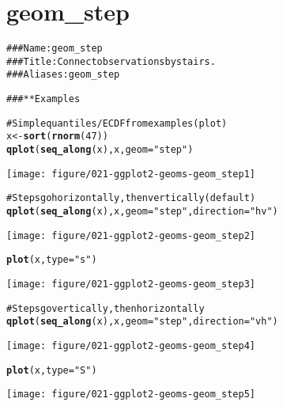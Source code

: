 \documentclass[a4paper,titlepage]{tufte-handout}\usepackage{graphicx, color}
\makeatletter
\def\maxwidth{ %
  \ifdim\Gin@nat@width>\linewidth
    \linewidth
  \else
    \Gin@nat@width
  \fi
}
\newcommand{\hlfunctioncall}[1]{\textcolor[rgb]{0.501960784313725,0,0.329411764705882}{\textbf{#1}}}%
\newcommand{\hlstring}[1]{\textcolor[rgb]{0.6,0.6,1}{#1}}%
\newcommand{\hlcomment}[1]{\textcolor[rgb]{0.180392156862745,0.6,0.341176470588235}{#1}}%
\newenvironment{kframe}{%
 \def\at@end@of@kframe{}%
 \ifinner\ifhmode%
  \def\at@end@of@kframe{\end{minipage}}%
  \begin{minipage}{\columnwidth}%
 \fi\fi%
 \def\FrameCommand##1{\hskip\@totalleftmargin \hskip-\fboxsep
 \colorbox{shadecolor}{##1}\hskip-\fboxsep
     \hskip-\linewidth \hskip-\@totalleftmargin \hskip\columnwidth}%
 \MakeFramed {\advance\hsize-\width
   \@totalleftmargin\z@ \linewidth\hsize
   \@setminipage}}%
 {\par\unskip\endMakeFramed%
 \at@end@of@kframe}
\newenvironment{knitrout}{}{} %
\makeatother
\begin{document}
\section{geom\_step}

\begin{knitrout}
\color{fgcolor}\begin{kframe}
\begin{alltt}
\hlcomment{### Name: geom_step}
\hlcomment{### Title: Connect observations by stairs.}
\hlcomment{### Aliases: geom_step}

\hlcomment{### ** Examples}

\hlcomment{# Simple quantiles/ECDF from examples(plot)}
x <- \hlfunctioncall{sort}(\hlfunctioncall{rnorm}(47))
\hlfunctioncall{qplot}(\hlfunctioncall{seq_along}(x), x, geom=\hlstring{"step"})
\end{alltt}
\end{kframe}
\texttt{[image: figure/021-ggplot2-geoms-geom\_step1]} 
\begin{kframe}\begin{alltt}

\hlcomment{# Steps go horizontally, then vertically (default)}
\hlfunctioncall{qplot}(\hlfunctioncall{seq_along}(x), x, geom=\hlstring{"step"}, direction = \hlstring{"hv"})
\end{alltt}
\end{kframe}
\texttt{[image: figure/021-ggplot2-geoms-geom\_step2]} 
\begin{kframe}\begin{alltt}
\hlfunctioncall{plot}(x, type = \hlstring{"s"})
\end{alltt}
\end{kframe}
\texttt{[image: figure/021-ggplot2-geoms-geom\_step3]} 
\begin{kframe}\begin{alltt}
\hlcomment{# Steps go vertically, then horizontally}
\hlfunctioncall{qplot}(\hlfunctioncall{seq_along}(x), x, geom=\hlstring{"step"}, direction = \hlstring{"vh"})
\end{alltt}
\end{kframe}
\texttt{[image: figure/021-ggplot2-geoms-geom\_step4]} 
\begin{kframe}\begin{alltt}
\hlfunctioncall{plot}(x, type = \hlstring{"S"})
\end{alltt}
\end{kframe}
\texttt{[image: figure/021-ggplot2-geoms-geom\_step5]} 
\begin{kframe}\begin{alltt}


\end{alltt}
\end{kframe}
\end{knitrout}
\end{document}

